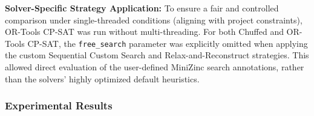 \documentclass{article}
\begin{document}
\textbf{Solver-Specific Strategy Application:}
To ensure a fair and controlled comparison under single-threaded conditions (aligning with project constraints), OR-Tools CP-SAT was run without multi-threading. For both Chuffed and OR-Tools CP-SAT, the \texttt{free\_search} parameter was explicitly omitted when applying the custom Sequential Custom Search and Relax-and-Reconstruct strategies. This allowed direct evaluation of the user-defined MiniZinc search annotations, rather than the solvers' highly optimized default heuristics.


\subsubsection{Experimental Results}
\begin{table}[htbp]
\centering
\small
{}
\caption{CPU time in seconds for finding the \textit{optimal solution} using \textit{Default Search Strategy (Solver's Default)}}
\end{table}
\end{document}
